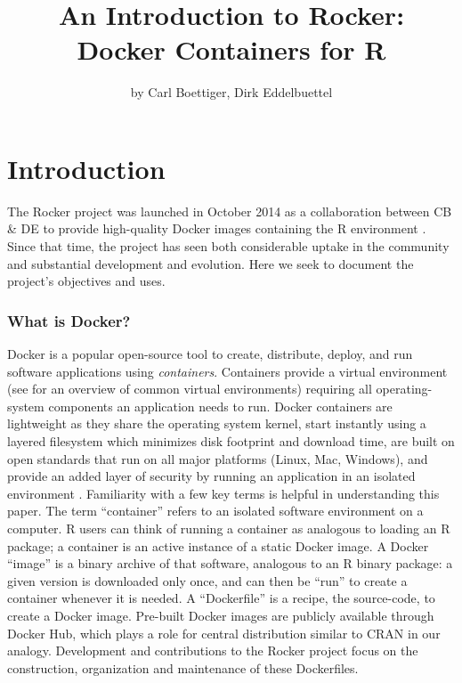 \title{An Introduction to Rocker:\\
Docker Containers for R}
\author{by Carl Boettiger, Dirk Eddelbuettel}

\maketitle


\section{Introduction}\label{introduction}

The Rocker project was launched in October 2014 as a collaboration
between CB \& DE to provide high-quality Docker images containing the R
environment \citep{edd2014}. Since that time, the project has seen both
considerable uptake in the community and substantial development and
evolution. Here we seek to document the project's objectives and uses.

\subsubsection{What is Docker?}\label{what-is-docker}

Docker is a popular open-source tool to create, distribute, deploy, and
run software applications using \emph{containers}. Containers provide a
virtual environment (see \citet{Clark2014} for an overview of common
virtual environments) requiring all operating-system components an
application needs to run. Docker containers are lightweight as they
share the operating system kernel, start instantly using a layered
filesystem which minimizes disk footprint and download time, are built
on open standards that run on all major platforms (Linux, Mac, Windows),
and provide an added layer of security by running an application in an
isolated environment \citep{what-docker}. Familiarity with a few key
terms is helpful in understanding this paper. The term ``container''
refers to an isolated software environment on a computer. R users can
think of running a container as analogous to loading an R package; a
container is an active instance of a static Docker image. A Docker
``image'' is a binary archive of that software, analogous to an R binary
package: a given version is downloaded only once, and can then be
``run'' to create a container whenever it is needed. A ``Dockerfile'' is
a recipe, the source-code, to create a Docker image. Pre-built Docker
images are publicly available through Docker Hub, which plays a role for
central distribution similar to CRAN in our analogy. Development and
contributions to the Rocker project focus on the construction,
organization and maintenance of these Dockerfiles.

